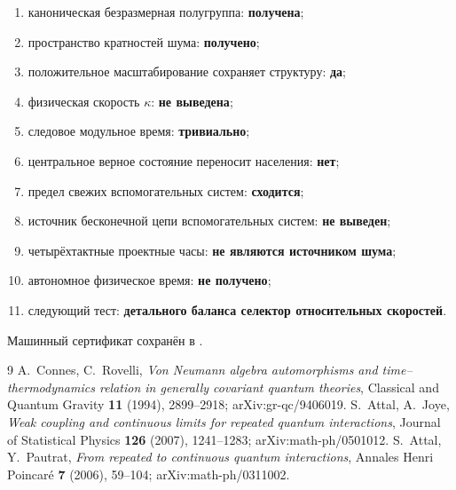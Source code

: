 \begin{protocol}
\begin{enumerate}
 \item каноническая безразмерная полугруппа: \textbf{получена};
 \item пространство кратностей шума: \textbf{получено};
 \item положительное масштабирование сохраняет структуру: \textbf{да};
 \item физическая скорость $\kappa$: \textbf{не выведена};
 \item следовое модульное время: \textbf{тривиально};
 \item центральное верное состояние переносит населения: \textbf{нет};
 \item предел свежих вспомогательных систем: \textbf{сходится};
 \item источник бесконечной цепи вспомогательных систем: \textbf{не выведен};
 \item четырёхтактные проектные часы: \textbf{не являются источником шума};
 \item автономное физическое время: \textbf{не получено};
 \item следующий тест: \textbf{детального баланса селектор относительных скоростей}.
\end{enumerate}
\end{protocol}

Машинный сертификат сохранён в
.

\begin{thebibliography}{9}
A.~Connes, C.~Rovelli,
\emph{Von Neumann algebra automorphisms and time--thermodynamics relation
in generally covariant quantum theories},
Classical and Quantum Gravity \textbf{11} (1994), 2899--2918;
arXiv:gr-qc/9406019.
S.~Attal, A.~Joye,
\emph{Weak coupling and continuous limits for repeated quantum
interactions}, Journal of Statistical Physics \textbf{126} (2007),
1241--1283; arXiv:math-ph/0501012.
S.~Attal, Y.~Pautrat,
\emph{From repeated to continuous quantum interactions},
Annales Henri Poincar\'e \textbf{7} (2006), 59--104;
arXiv:math-ph/0311002.
\end{thebibliography}